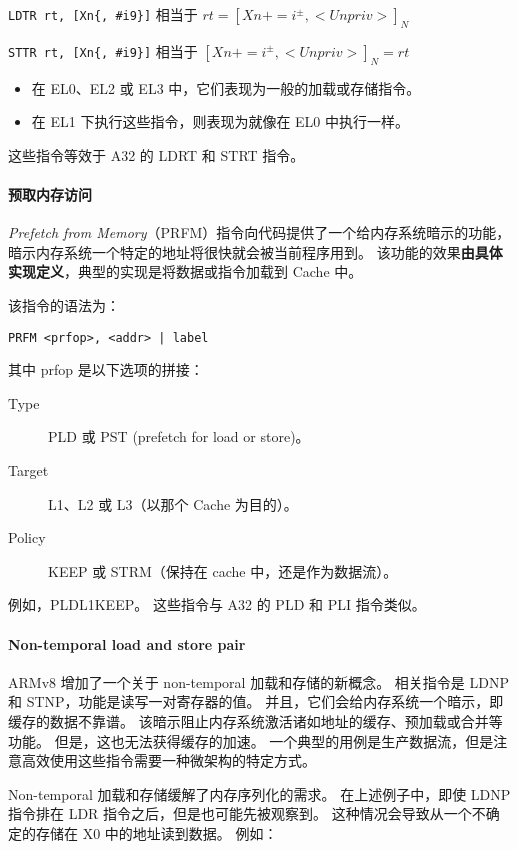 \lstinline!LDTR rt, [Xn{, #i9}]! 相当于 $rt = [Xn += i^{\pm}, <Unpriv>]_N$

\lstinline!STTR rt, [Xn{, #i9}]! 相当于 $[Xn += i^{\pm}, <Unpriv>]_N = rt$

\begin{itemize}
  \item 在 EL0、EL2 或 EL3 中，它们表现为一般的加载或存储指令。
  \item 在 EL1 下执行这些指令，则表现为就像在 EL0 中执行一样。
\end{itemize}
 
这些指令等效于 A32 的 LDRT 和 STRT 指令。

\paragraph{预取内存访问}

\textit{Prefetch from Memory}（PRFM）指令向代码提供了一个给内存系统暗示的功能，暗示内存系统一个特定的地址将很快就会被当前程序用到。
该功能的效果\textbf{由具体实现定义}，典型的实现是将数据或指令加载到 Cache 中。

该指令的语法为：

\lstinline!PRFM <prfop>, <addr> | label!

其中 prfop 是以下选项的拼接：

\begin{description}
  \item[Type] PLD 或 PST (prefetch for load or store)。
  \item[Target] L1、L2 或 L3（以那个 Cache 为目的）。
  \item[Policy] KEEP 或 STRM（保持在 cache 中，还是作为数据流）。
\end{description}

例如，PLDL1KEEP。
这些指令与 A32 的 PLD 和 PLI 指令类似。

\paragraph{Non-temporal load and store pair}

ARMv8 增加了一个关于 non-temporal 加载和存储的新概念。
相关指令是 LDNP 和 STNP，功能是读写一对寄存器的值。
并且，它们会给内存系统一个暗示，即缓存的数据不靠谱。
该暗示阻止内存系统激活诸如地址的缓存、预加载或合并等功能。
但是，这也无法获得缓存的加速。
一个典型的用例是生产数据流，但是注意高效使用这些指令需要一种微架构的特定方式。

Non-temporal 加载和存储缓解了内存序列化的需求。
在上述例子中，即使 LDNP 指令排在 LDR 指令之后，但是也可能先被观察到。
这种情况会导致从一个不确定的存储在 X0 中的地址读到数据。
例如：

